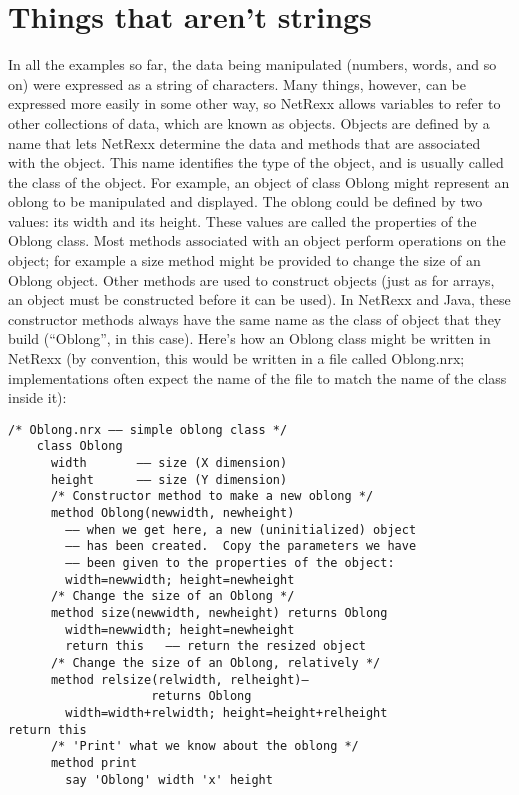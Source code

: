 \section{Things that aren’t strings}
In all the examples so far, the data being manipulated (numbers, words, and so on) were expressed as a string of characters. Many things, however, can be expressed more easily in some other way, so NetRexx allows variables to refer to other collections of data, which are known as objects.
Objects are defined by a name that lets NetRexx determine the data and methods that are associated with the object. This name identifies the type of the object, and is usually called the class of the object.
For example, an object of class Oblong might represent an oblong to be manipulated and displayed. The oblong could be defined by two values: its width and its height. These values are called the properties of the Oblong class.
Most methods associated with an object perform operations on the object; for example a size method might be provided to change the size of an Oblong object. Other methods are used to construct objects (just as for arrays, an object must be constructed before it can be used). In NetRexx and Java, these constructor methods always have the same name as the class of object that they build (“Oblong”, in this case).
Here’s how an Oblong class might be written in NetRexx (by convention,
this would be written in a file called Oblong.nrx; implementations
often expect the name of the file to match the name of the class
inside it):
\begin{lstlisting}[label=oblong,caption=Oblong]
    /* Oblong.nrx –– simple oblong class */
    class Oblong
      width       –– size (X dimension)
      height      –– size (Y dimension)
      /* Constructor method to make a new oblong */
      method Oblong(newwidth, newheight)
        –– when we get here, a new (uninitialized) object
        –– has been created.  Copy the parameters we have
        –– been given to the properties of the object:
        width=newwidth; height=newheight
      /* Change the size of an Oblong */
      method size(newwidth, newheight) returns Oblong
        width=newwidth; height=newheight
        return this   –– return the resized object
      /* Change the size of an Oblong, relatively */
      method relsize(relwidth, relheight)–
                    returns Oblong
        width=width+relwidth; height=height+relheight
return this
      /* 'Print' what we know about the oblong */
      method print
        say 'Oblong' width 'x' height
\end{lstlisting}
